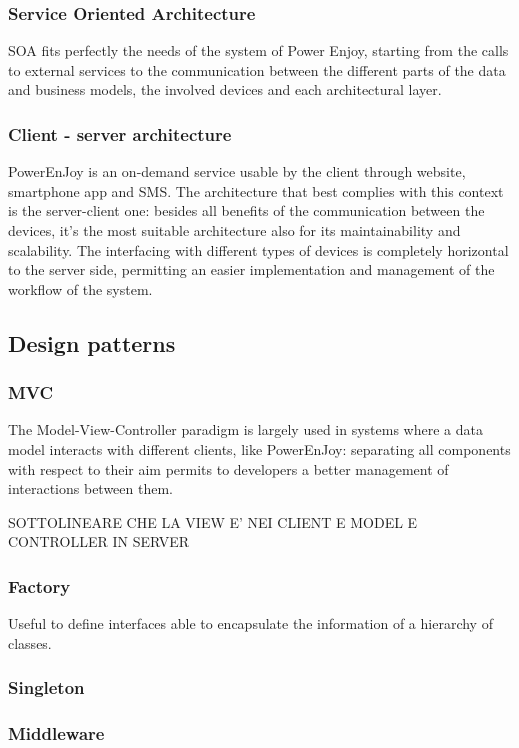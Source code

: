 \subsubsection{Service Oriented Architecture}
SOA fits perfectly the needs of  the system of Power Enjoy, starting from the calls to external services to the communication between the different parts of the data and business models, the involved devices and each architectural layer.

\subsubsection{Client - server architecture}
PowerEnJoy is an on-demand service usable by the client through website, smartphone app and SMS.
The architecture that best complies with this context is the server-client one: besides all benefits of the communication between the devices, it’s the most suitable architecture also for its maintainability and scalability.
The interfacing with different types of devices is completely horizontal to the server side, permitting an easier implementation and management of the workflow of the system.

\subsection{Design patterns}
\subsubsection{MVC}
The Model-View-Controller paradigm is largely used in systems where a data model interacts with different clients, like PowerEnJoy: separating all components with respect to their aim permits to developers a better management of interactions between them.

SOTTOLINEARE CHE LA VIEW E' NEI CLIENT E MODEL E CONTROLLER IN SERVER

\subsubsection{Factory}
Useful to define interfaces able to encapsulate the information of a hierarchy of classes.

\subsubsection{Singleton}

\subsubsection{Middleware}




